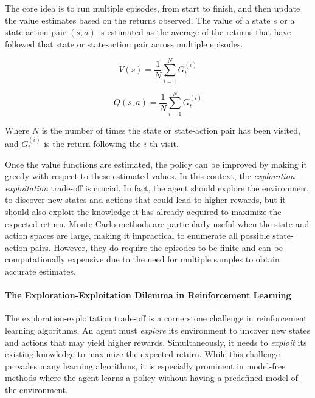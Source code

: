 The core idea is to run multiple episodes, 
 from start to finish, and then update the value estimates based on the returns observed. 
 The value of a state \(s\) or a state-action pair \((s, a)\) is estimated as the average of the returns that have followed that state or state-action pair across multiple episodes.

\begin{equation}
V(s) = \frac{1}{N} \sum_{i=1}^{N} G_t^{(i)}
\end{equation}

\begin{equation}
Q(s, a) = \frac{1}{N} \sum_{i=1}^{N} G_t^{(i)}
\end{equation}

Where \(N\) is the number of times the state or state-action pair has been visited, and \(G_t^{(i)}\) is the return following the \(i\)-th visit.

Once the value functions are estimated, 
 the policy can be improved by making it greedy with respect to these estimated values. 
%
In this context, the \emph{exploration-exploitation} trade-off is crucial.
%
In fact, the agent should explore the environment to discover new states and actions that could lead to higher rewards,
  but it should also exploit the knowledge it has already acquired to maximize the expected return.
%
Monte Carlo methods are particularly useful when the state and action spaces are large, making it impractical to enumerate all possible state-action pairs. However, they do require the episodes to be finite and can be computationally expensive due to the need for multiple samples to obtain accurate estimates.

\paragraph*{The Exploration-Exploitation Dilemma in Reinforcement Learning}
The exploration-exploitation trade-off is a cornerstone challenge in reinforcement learning algorithms. 
 An agent must \emph{explore} its environment 
 to uncover new states and actions that may yield higher rewards. 
% 
Simultaneously, 
 it needs to \emph{exploit} its existing knowledge to maximize the expected return. 
 While this challenge pervades many learning algorithms, 
 it is especially prominent in model-free methods 
 where the agent learns a policy without having a predefined model of the environment.

